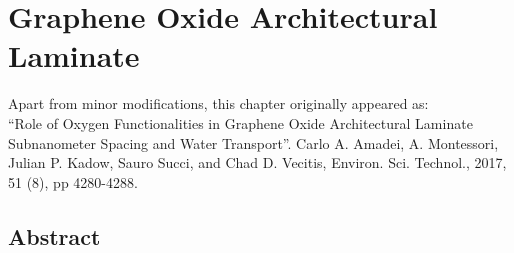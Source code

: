 \chapter{Graphene Oxide Architectural Laminate}
\thispagestyle{plain}
\vspace{-.5cm}

\noindent Apart from minor modifications, this chapter originally appeared as:\newline\\
\ssp ``Role of Oxygen Functionalities in Graphene Oxide Architectural Laminate Subnanometer Spacing and Water Transport''.
Carlo A. Amadei, A. Montessori, Julian P. Kadow, Sauro Succi, and Chad D. Vecitis, Environ. Sci. Technol., 2017, 51 (8), pp 4280-4288.

\section*{Abstract}
    \dsp
    


